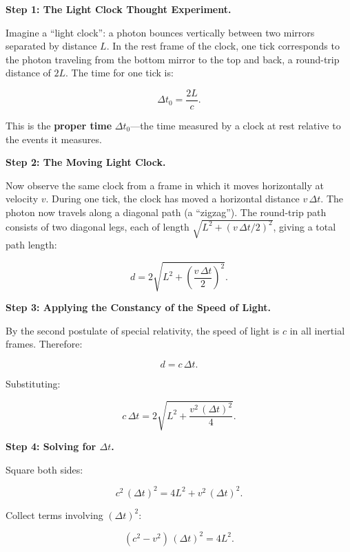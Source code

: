 \textbf{Step 1: The Light Clock Thought Experiment.}

Imagine a ``light clock'': a photon bounces vertically between two mirrors separated by distance $L$. In the rest frame of the clock, one tick corresponds to the photon traveling from the bottom mirror to the top and back, a round-trip distance of $2L$. The time for one tick is:

\begin{equation}
\Delta t_0 = \frac{2L}{c}.
\end{equation}

This is the \textbf{proper time} $\Delta t_0$---the time measured by a clock at rest relative to the events it measures.

\textbf{Step 2: The Moving Light Clock.}

Now observe the same clock from a frame in which it moves horizontally at velocity $v$. During one tick, the clock has moved a horizontal distance $v\,\Delta t$. The photon now travels along a diagonal path (a ``zigzag''). The round-trip path consists of two diagonal legs, each of length $\sqrt{L^2 + (v\,\Delta t/2)^2}$, giving a total path length:

\begin{equation}
d = 2\sqrt{L^2 + \left(\frac{v\,\Delta t}{2}\right)^2}.
\end{equation}

\textbf{Step 3: Applying the Constancy of the Speed of Light.}

By the second postulate of special relativity, the speed of light is $c$ in all inertial frames. Therefore:

\begin{equation}
d = c\,\Delta t.
\end{equation}

Substituting:

\begin{equation}
c\,\Delta t = 2\sqrt{L^2 + \frac{v^2\,(\Delta t)^2}{4}}.
\end{equation}

\textbf{Step 4: Solving for $\Delta t$.}

Square both sides:

\begin{equation}
c^2\,(\Delta t)^2 = 4L^2 + v^2\,(\Delta t)^2.
\end{equation}

Collect terms involving $(\Delta t)^2$:

\begin{equation}
(c^2 - v^2)\,(\Delta t)^2 = 4L^2.
\end{equation}

